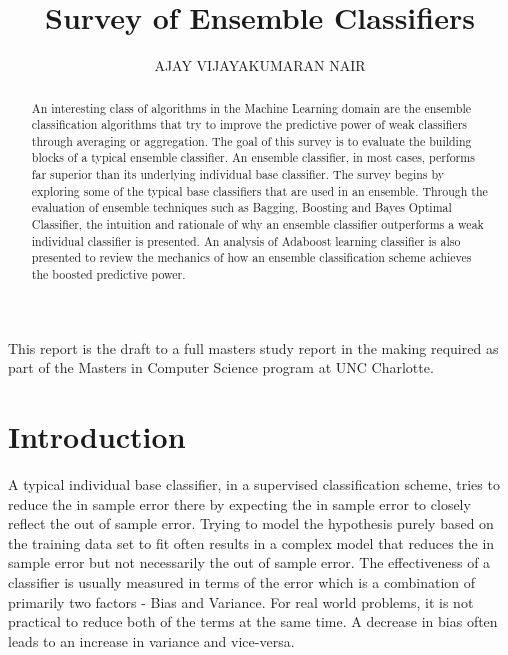\documentclass{acmtog} %
\begin{document}

\title{Survey of Ensemble Classifiers} %

\author{AJAY VIJAYAKUMARAN NAIR 
}


\maketitle

\begin{bottomstuff}
This report is the draft to a full masters study report in the making required as part of the Masters in Computer Science program at UNC Charlotte.
\end{bottomstuff}


\begin{abstract}
An interesting class of algorithms in the Machine Learning domain are the ensemble classification algorithms that try to improve the predictive power of weak classifiers through averaging or aggregation. The goal of this survey is to evaluate the building blocks of a typical ensemble classifier. An ensemble classifier, in most cases, performs far superior than its underlying individual base classifier. The survey begins by exploring some of the typical base classifiers that are used in an ensemble. Through the evaluation of ensemble techniques such as Bagging, Boosting and Bayes Optimal Classifier, the intuition and rationale of why an ensemble classifier outperforms a weak individual classifier is presented. An analysis of Adaboost learning classifier is also presented to review the mechanics of how an ensemble classification scheme achieves the boosted predictive power.
\end{abstract}

\section{Introduction}
A typical individual base classifier, in a supervised classification scheme, tries to reduce the in sample error there by expecting the in sample error to closely reflect the out of sample error. Trying to model the hypothesis purely based on the training data set to fit often results in a complex model that reduces the in sample error but not necessarily the out of sample error. The effectiveness of a classifier is usually measured in terms of the error which is a combination of primarily two factors - Bias and Variance. For real world problems, it is not practical to reduce both of the terms at the same time. A decrease in bias often leads to an increase in variance and vice-versa.
\end{document}

